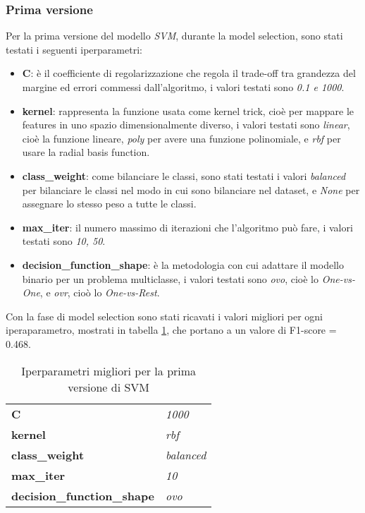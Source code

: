 \subsubsection{Prima versione}\label{subsubsec:svmv1}
Per la prima versione del modello \textit{SVM}, durante la model selection, sono stati testati i seguenti iperparametri:
\begin{itemize}
\item \textbf{C}: è il coefficiente di regolarizzazione che regola il trade-off tra grandezza del margine ed errori commessi dall'algoritmo, i valori testati sono \textit{0.1 e 1000}.
\item \textbf{kernel}: rappresenta la funzione usata come kernel trick, cioè per mappare le features in uno spazio dimensionalmente diverso, i valori testati sono \textit{linear}, cioè la funzione lineare, \textit{poly} per avere una funzione polinomiale, e \textit{rbf} per usare la radial basis function.
\item \textbf{class\_weight}: come bilanciare le classi, sono stati testati i valori \textit{balanced} per bilanciare le classi nel modo in cui sono bilanciare nel dataset, e \textit{None} per assegnare lo stesso peso a tutte le classi.
\item \textbf{max\_iter}: il numero massimo di iterazioni che l'algoritmo può fare, i valori testati sono \textit{10, 50}.
\item \textbf{decision\_function\_shape}: è la metodologia con cui adattare il modello binario per un problema multiclasse, i valori testati sono \textit{ovo}, cioè lo \textit{One-vs-One}, e \textit{ovr}, cioò lo \textit{One-vs-Rest}.
\end{itemize}

Con la fase di model selection sono stati ricavati i valori migliori per ogni iperaparametro, mostrati in tabella \ref{tab:svmv1}, che portano a un valore di F1-score = 0.468.

\begin{table}[h] 
\centering
\begin{tabular}{l l}
\hline
\textbf{C} & \textit{1000}\\
\textbf{kernel} & \textit{rbf}\\
\textbf{class\_weight} & \textit{balanced}\\
\textbf{max\_iter} & \textit{10}\\
\textbf{decision\_function\_shape} & \textit{ovo}\\
\hline
\end{tabular}
\caption{Iperparametri migliori per la prima versione di SVM}
\label{tab:svmv1}
\end{table}


